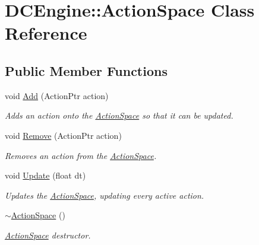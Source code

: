 \hypertarget{classDCEngine_1_1ActionSpace}{\section{D\-C\-Engine\-:\-:Action\-Space Class Reference}
\label{classDCEngine_1_1ActionSpace}
}
\subsection*{Public Member Functions}
\begin{DoxyCompactItemize}
\item 
void \hyperlink{classDCEngine_1_1ActionSpace_aca9de11996ef2a664941535ff228fb1d}{Add} (Action\-Ptr action)
\begin{DoxyCompactList}\small\item\em Adds an action onto the \hyperlink{classDCEngine_1_1ActionSpace}{Action\-Space} so that it can be updated. \end{DoxyCompactList}\item 
void \hyperlink{classDCEngine_1_1ActionSpace_a03ce00e30e7664b7301a576b4d7fafa7}{Remove} (Action\-Ptr action)
\begin{DoxyCompactList}\small\item\em Removes an action from the \hyperlink{classDCEngine_1_1ActionSpace}{Action\-Space}. \end{DoxyCompactList}\item 
void \hyperlink{classDCEngine_1_1ActionSpace_afa97da56aaeb24a02727bd9e98d896be}{Update} (float dt)
\begin{DoxyCompactList}\small\item\em Updates the \hyperlink{classDCEngine_1_1ActionSpace}{Action\-Space}, updating every active action. \end{DoxyCompactList}\item 
\hypertarget{classDCEngine_1_1ActionSpace_a3b6afb590552adb4a6ccb3d356e59b11}{\hyperlink{classDCEngine_1_1ActionSpace_a3b6afb590552adb4a6ccb3d356e59b11}{$\sim$\-Action\-Space} ()}\label{classDCEngine_1_1ActionSpace_a3b6afb590552adb4a6ccb3d356e59b11}

\begin{DoxyCompactList}\small\item\em \hyperlink{classDCEngine_1_1ActionSpace}{Action\-Space} destructor. \end{DoxyCompactList}\end{DoxyCompactItemize}

